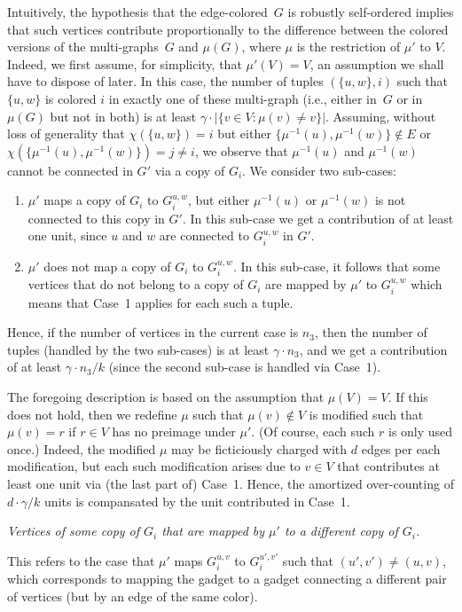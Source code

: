 \documentclass[10pt,a4paper]{article}
\theoremstyle{definition}
\newcommand{\imu}{{\mu^{-1}}}
\newcommand{\BE}{\begin{enumerate}}
\newcommand{\EE}{\end{enumerate}}
\begin{document}
%
Intuitively,
the hypothesis that the edge-colored~$G$ is robustly self-ordered
implies that such vertices contribute proportionally
to the difference between the colored versions of
the multi-graphs~$G$ and $\mu(G)$,
where $\mu$ is the restriction of $\mu'$ to $V$.
Indeed, we first assume, for simplicity, that $\mu'(V)=V$,
an assumption we shall have to dispose of later.
In this case, the number of tuples $(\{u,w\},i)$
such that $\{u,w\}$ is colored $i$ in exactly one of these multi-graph
(i.e., either in~$G$ or in $\mu(G)$ but not in both)
is at least $\gamma\cdot|\{v\!\in\!V:\mu(v)\neq v\}|$.
Assuming, without loss of generality that $\chi(\{u,w\})=i$
but either $\{\imu(u),\imu(w)\}\not\in E$
or $\chi(\{\imu(u),\imu(w)\})=j\neq i$,
we observe that $\imu(u)$ and $\imu(w)$ cannot
be connected in $G'$ via a copy of $G_i$.
We consider two sub-cases:
\BE
\item $\mu'$ maps a copy of $G_i$ to $G_i^{u,w}$,
but either $\imu(u)$ or $\imu(w)$ is not connected to this copy in $G'$.
In this sub-case we get a contribution of at least one unit,
since $u$ and $w$ are connected to $G_i^{u,w}$ in $G'$.
\item $\mu'$ does not map a copy of $G_i$ to $G_i^{u,w}$.
In this sub-case, it follows that some vertices that do not belong
to a copy of $G_i$ are mapped by $\mu'$ to $G_i^{u,w}$
which means that Case~1 applies for each such a tuple.
\EE
Hence, if the number of vertices in the current case is $n_3$,
then the number of tuples (handled by the two sub-cases)
is at least $\gamma\cdot n_3$, and we get a contribution
of at least $\gamma\cdot{n_3}/{k}$
(since the second sub-case is handled via Case~1).

The foregoing description is based on the assumption that $\mu(V)=V$.
If this does not hold, then we redefine $\mu$ such that $\mu(v)\not\in V$
is modified such that $\mu(v)=r$ if $r\in V$ has no preimage under $\mu'$.
(Of course, each such $r$ is only used once.)
Indeed, the modified $\mu$ may be ficticiously charged with $d$ edges
per each modification, but each such modification arises due to $v\in V$
that contributes at least one unit via (the last part of) Case~1.
Hence, the amortized over-counting of $d\cdot \gamma/k$ units
is compansated by the unit contributed in Case~1.
%

\item[{\em Case 4}:] {\em Vertices of some copy of $G_i$
that are mapped by $\mu'$ to a different copy of $G_i$.}

This refers to the case that $\mu'$ maps $G_i^{u,v}$
to $G_i^{u',v'}$ such that $(u',v')\neq(u,v)$,
which corresponds to mapping the gadget to a gadget
connecting a different pair of vertices
(but by an edge of the same color).
\end{document}
